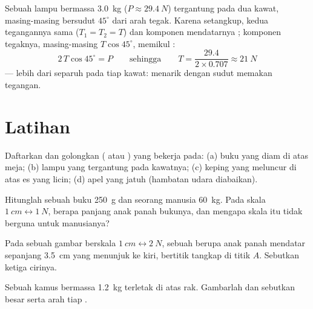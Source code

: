 \begin{example}\label{ex:g10:inertia:lamp}
Sebuah lampu bermassa \qty{3.0}{kg} ($P \approx \qty{29.4}{N}$)
tergantung pada dua kawat, masing-masing bersudut $45^\circ$ dari arah
tegak. Karena setangkup, kedua tegangannya sama ($T_1 = T_2 = T$) dan
komponen mendatarnya ; komponen tegaknya,
masing-masing $T \cos 45^\circ$, memikul :
\[
2\,T \cos 45^\circ = P
\qquad\text{sehingga}\qquad
T = \frac{29.4}{2 \times 0.707} \approx \qty{21}{N}
\]
--- lebih dari separuh  pada tiap kawat: menarik dengan sudut
memakan tegangan.
\end{example}

\section{Latihan}

\begin{exercise}[$\star$]\label{exo:g10:inertia:1}
Daftarkan dan golongkan ( atau )  yang
bekerja pada: (a) buku yang diam di atas meja; (b) lampu yang
tergantung pada kawatnya; (c) keping yang meluncur di atas es yang
licin; (d) apel yang jatuh (hambatan udara diabaikan).
\end{exercise}

\begin{exercise}[$\star$]\label{exo:g10:inertia:2}
Hitunglah  sebuah buku \qty{250}{g} dan  seorang manusia
\qty{60}{kg}. Pada skala $\qty{1}{cm} \leftrightarrow \qty{1}{N}$,
berapa panjang anak panah bukunya, dan mengapa skala itu tidak berguna
untuk manusianya?
\end{exercise}

\begin{exercise}[$\star$]\label{exo:g10:inertia:3}
Pada sebuah gambar berskala $\qty{1}{cm} \leftrightarrow \qty{2}{N}$,
sebuah  berupa anak panah mendatar sepanjang \qty{3.5}{cm} yang
menunjuk ke kiri, bertitik tangkap di titik $A$. Sebutkan ketiga
cirinya.
\end{exercise}

\begin{exercise}[$\star$]\label{exo:g10:inertia:4}
Sebuah kamus bermassa \qty{1.2}{kg} terletak di atas rak. Gambarlah
 dan sebutkan besar serta arah tiap .
\end{exercise}

